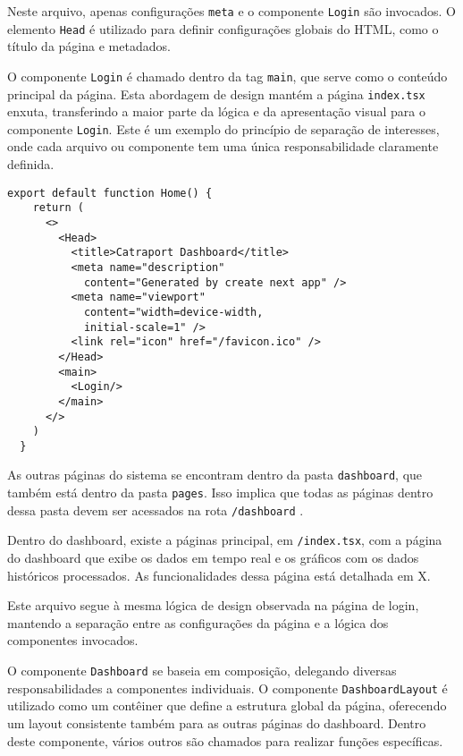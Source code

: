 Neste arquivo, apenas configurações \texttt{meta} e o componente \texttt{Login} são invocados. O elemento \texttt{Head} é utilizado para definir configurações globais do HTML, como o título da página e metadados. 

O componente \texttt{Login} é chamado dentro da tag \texttt{main}, que serve como o conteúdo principal da página. Esta abordagem de design mantém a página \texttt{index.tsx} enxuta, transferindo a maior parte da lógica e da apresentação visual para o componente \texttt{Login}. Este é um exemplo do princípio de separação de interesses, onde cada arquivo ou componente tem uma única responsabilidade claramente definida.

\begin{verbatim}
export default function Home() {
    return (
      <>
        <Head>
          <title>Catraport Dashboard</title>
          <meta name="description" 
            content="Generated by create next app" />
          <meta name="viewport" 
            content="width=device-width,
            initial-scale=1" />
          <link rel="icon" href="/favicon.ico" />
        </Head>
        <main>
          <Login/>
        </main>
      </>
    )
  }
\end{verbatim}

As outras páginas do sistema se encontram dentro da pasta \texttt{dashboard}, que também está dentro da pasta \texttt{pages}. Isso implica que todas as páginas dentro dessa pasta devem ser acessados na rota \texttt{/dashboard} \cite{nextjsDefiningRoutes}.

Dentro do dashboard, existe a páginas principal, em \texttt{/index.tsx}, com a página do dashboard que exibe os dados em tempo real e os gráficos com os dados históricos processados. As funcionalidades dessa página está detalhada em X. %

Este arquivo segue à mesma lógica de design observada na página de login, mantendo a separação entre as configurações da página e a lógica dos componentes invocados.

O componente \texttt{Dashboard} se baseia em composição, delegando diversas responsabilidades a componentes individuais. O componente \texttt{DashboardLayout} é utilizado como um contêiner que define a estrutura global da página, oferecendo um layout consistente também para as outras páginas do dashboard. Dentro deste componente, vários outros são chamados para realizar funções específicas.

